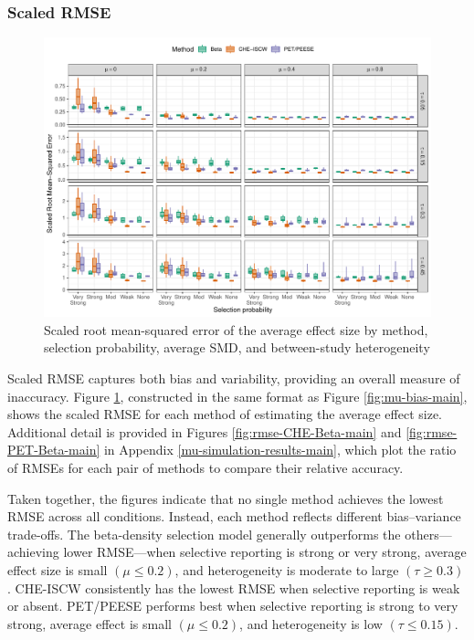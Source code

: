 \documentclass[
  american,
  man, donotrepeattitle,floatsintext]{apa7}
\begin{document}
\subsubsection{Scaled RMSE}\label{scaled-rmse}

\begin{figure}
\includegraphics{beta-function-selection-models-with-dependent-effects_files/figure-latex/mu-rmse-main-1} \caption{Scaled root mean-squared error of the average effect size by method, selection probability, average SMD, and between-study heterogeneity}\label{fig:mu-rmse-main}
\end{figure}

Scaled RMSE captures both bias and variability, providing an overall measure of inaccuracy. Figure \ref{fig:mu-rmse-main}, constructed in the same format as Figure \ref{fig:mu-bias-main}, shows the scaled RMSE for each method of estimating the average effect size. Additional detail is provided in Figures \ref{fig:rmse-CHE-Beta-main} and \ref{fig:rmse-PET-Beta-main} in Appendix \ref{mu-simulation-results-main}, which plot the ratio of RMSEs for each pair of methods to compare their relative accuracy.

Taken together, the figures indicate that no single method achieves the lowest RMSE across all conditions. Instead, each method reflects different bias--variance trade-offs.
The beta-density selection model generally outperforms the others---achieving lower RMSE---when selective reporting is strong or very strong, average effect size is small \((\mu \leq 0.2)\), and heterogeneity is moderate to large \((\tau \geq 0.3)\).
CHE-ISCW consistently has the lowest RMSE when selective reporting is weak or absent.
PET/PEESE performs best when selective reporting is strong to very strong, average effect is small \((\mu \leq 0.2)\), and heterogeneity is low \((\tau \leq 0.15)\).
\end{document}
